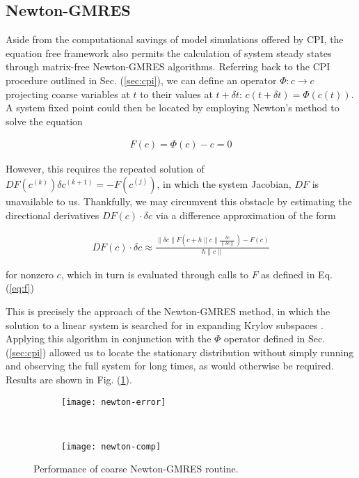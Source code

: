 \documentclass[12pt]{article}
\begin{document}
\begin{onehalfspace}
\section{Newton-GMRES}

Aside from the computational savings of model simulations offered by CPI, the equation free framework also permits the calculation of system steady states through matrix-free Newton-GMRES algorithms. Referring back to the CPI procedure outlined in Sec. (\ref{sec:cpi}), we can define an operator $\Phi: c \rightarrow c$ projecting coarse variables at $t$ to their values at $t + \delta t$: $c(t+\delta t) =\Phi(c(t))$. A system fixed point could then be located by employing Newton's method to solve the equation

\begin{align}
\label{eq:f}
F(c) = \Phi(c) - c = 0
\end{align}

However, this requires the repeated solution of $DF(c^{(k)}) \delta c^{(k+1)} = -F(c^{(j)})$, in which the system Jacobian, $DF$ is unavailable to us. Thankfully, we may circumvent this obstacle by estimating the directional derivatives $DF(c) \cdot \delta c$ via a difference approximation of the form

\begin{align}
  DF(c) \cdot \delta c \approx \frac{\| \delta c \| F(c + h \| c \| \frac{\delta c}{\| \delta c \|}) - F(c)}{h \| c \|}
\end{align}

for nonzero $c$, which in turn is evaluated through calls to $F$ as defined in Eq. (\ref{eq:f})

This is precisely the approach of the Newton-GMRES method, in which the solution to a linear system is searched for in expanding Krylov subspaces \cite{kelley_solving_2003}. Applying this algorithm in conjunction with the $\Phi$ operator defined in Sec. (\ref{sec:cpi}) allowed us to locate the stationary distribution without simply running and observing the full system for long times, as would otherwise be required. Results are shown in Fig. (\ref{fig:newton-results}).

\begin{figure}[h!]
  \vspace{-5mm}
  \centering
  \begin{subfigure}{0.75\textwidth}
    \centering
    \texttt{[image: newton-error]}
  \end{subfigure} \\ %
  \begin{subfigure}{0.75\textwidth}
    \centering
    \texttt{[image: newton-comp]}
  \end{subfigure}%
  \caption{Performance of coarse Newton-GMRES routine. \label{fig:newton-results}}
\end{figure}



\end{onehalfspace}
\end{document}
